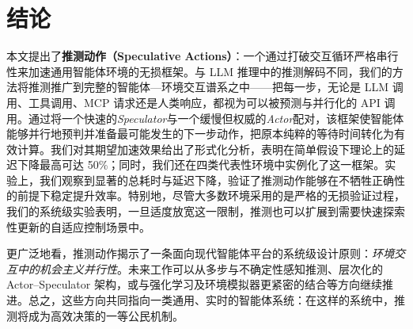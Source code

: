 \section{结论}
\label{sec:conclusion}
本文提出了\textbf{推测动作（Speculative Actions）}：一个通过打破交互循环严格串行性来加速通用智能体环境的无损框架。与 LLM 推理中的推测解码不同，我们的方法将推测推广到完整的智能体—环境交互谱系之中——把每一步，无论是 LLM 调用、工具调用、MCP 请求还是人类响应，都视为可以被预测与并行化的 API 调用。通过将一个快速的\emph{Speculator}与一个缓慢但权威的\emph{Actor}配对，该框架使智能体能够并行地预判并准备最可能发生的下一步动作，把原本纯粹的等待时间转化为有效计算。我们对其期望加速效果给出了形式化分析，表明在简单假设下理论上的延迟下降最高可达 50\%；同时，我们还在四类代表性环境中实例化了这一框架。实验上，我们观察到显著的总耗时与延迟下降，验证了推测动作能够在不牺牲正确性的前提下稳定提升效率。特别地，尽管大多数环境采用的是严格的无损验证过程，我们的系统级实验表明，一旦适度放宽这一限制，推测也可以扩展到需要快速探索性更新的自适应控制场景中。

更广泛地看，推测动作揭示了一条面向现代智能体平台的系统级设计原则：\emph{环境交互中的机会主义并行性}。未来工作可以从多步与不确定性感知推测、层次化的 Actor--Speculator 架构，或与强化学习及环境模拟器更紧密的结合等方向继续推进。总之，这些方向共同指向一类通用、实时的智能体系统：在这样的系统中，推测将成为高效决策的一等公民机制。
